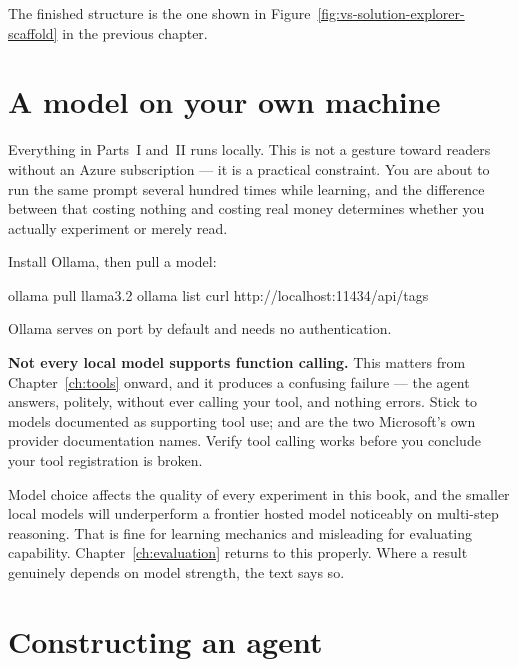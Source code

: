 The finished structure is the one shown in
Figure~\ref{fig:vs-solution-explorer-scaffold} in the previous chapter.

\section{A model on your own machine}
\label{sec:local-model}

Everything in Parts~I and~II runs locally. This is not a gesture toward readers
without an Azure subscription --- it is a practical constraint. You are about to
run the same prompt several hundred times while learning, and the difference
between that costing nothing and costing real money determines whether you
actually experiment or merely read.

Install Ollama, then pull a model:

\begin{shellcmd}
ollama pull llama3.2
ollama list
curl http://localhost:11434/api/tags
\end{shellcmd}

Ollama serves on port  by default and needs no authentication.

\begin{warning}
\textbf{Not every local model supports function calling.} This matters from
Chapter~\ref{ch:tools} onward, and it produces a confusing failure --- the agent
answers, politely, without ever calling your tool, and nothing errors. Stick to
models documented as supporting tool use;  and  are
the two Microsoft's own provider documentation names. Verify tool calling works
before you conclude your tool registration is broken.
\end{warning}

\begin{note}
Model choice affects the quality of every experiment in this book, and the
smaller local models will underperform a frontier hosted model noticeably on
multi-step reasoning. That is fine for learning mechanics and misleading for
evaluating capability. Chapter~\ref{ch:evaluation} returns to this properly.
Where a result genuinely depends on model strength, the text says so.
\end{note}

\section{Constructing an agent}
\label{sec:construction}

